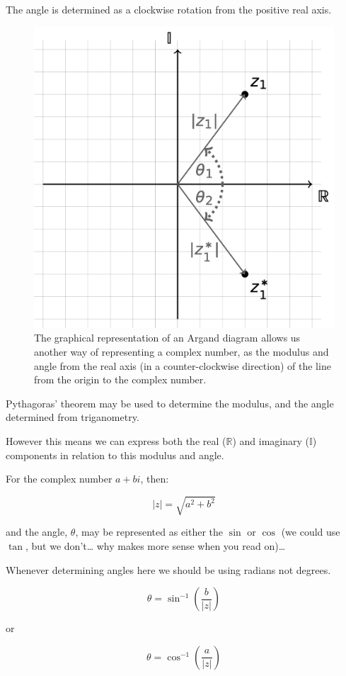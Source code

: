 \documentclass[
]{book}
\begin{document}
The angle is determined as a clockwise rotation from the positive real axis.

\begin{figure}

{\centering \includegraphics[width=0.5\linewidth]{images/argandangle} 

}

\caption{The graphical representation of an Argand diagram allows us another way of representing a complex number, as the modulus and angle from the real axis (in a counter-clockwise direction) of the line from the origin to the complex number.}\label{fig:argandangle}
\end{figure}

Pythagoras' theorem may be used to determine the modulus, and the angle determined from triganometry.

However this means we can express both the real (\(\mathbb{R}\)) and imaginary (\(\mathbb{I}\)) components in relation to this modulus and angle.

For the complex number \(a+bi\), then:

\begin{equation*}
|z| = \sqrt{a^2+b^2}
\end{equation*}

and the angle, \(\theta\), may be represented as either the \(\sin\) or \(\cos\) (we could use \(\tan\), but we don't\ldots{} why makes more sense when you read on)\ldots{}

Whenever determining angles here we should be using radians not degrees.

\begin{equation*}
\theta =  \sin^{-1} \left(\frac{b}{|z|}\right)
\end{equation*}

or

\begin{equation*}
\theta =  \cos^{-1} \left(\frac{a}{|z|}\right)
\end{equation*}
\end{document}
